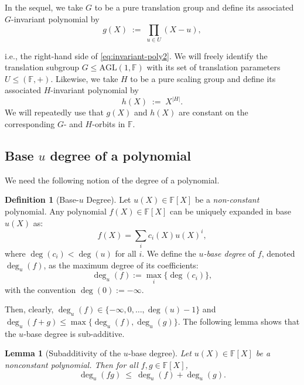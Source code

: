 \documentclass[11pt]{article}
\theoremstyle{plain}
\newtheorem{lemma}[theorem]{Lemma}
\theoremstyle{definition}
\newtheorem{definition}[theorem]{Definition}
\newcommand{\F}{\mathbb{F}}
\begin{document}
\smallskip
\noindent
In the sequel, we take $G$ to be a pure translation group and define its associated $G$-invariant polynomial by
\begin{equation}
\label{eq:additive-subgroup-poly}    
g(X) \;:=\; \prod_{u\in U}(X-u),
\end{equation}

i.e., the right-hand side of \eqref{eq:invariant-poly2}. We will freely identify the translation subgroup $G\le\mathrm{AGL}(1,\mathbb{F})$ with its set of translation parameters $U\le(\mathbb{F},+)$.
Likewise, we take $H$ to be a pure scaling group and define its associated $H$-invariant polynomial by
\begin{equation}
    \label{eq:mult-subgroup-poly}
h(X) \;:=\; X^{|H|}.
\end{equation}
We will repeatedly use that $g(X)$ and $h(X)$ are constant on the corresponding $G$- and $H$-orbits in $\mathbb{F}$.



\subsection{\texorpdfstring{Base $u$ degree of a polynomial}{Base u degree of a polynomial}}

We need the following notion of the degree of a polynomial.

\begin{definition}[Base-$u$ Degree]
    Let $u(X) \in \mathbb{F}[X]$ be a \emph{non-constant} polynomial. Any polynomial $f(X) \in \mathbb{F}[X]$ can be uniquely expanded in base $u(X)$ as:
    \[
        f(X) = \sum_{i} c_i(X) u(X)^i,
    \]
    where $\deg(c_i) < \deg(u)$ for all $i$. We define the \emph{$u$-base degree} of $f$, denoted $\deg_u(f)$, as the maximum degree of its coefficients:
    \[
        \deg_u(f) := \max_i \{ \deg(c_i) \},
    \]
    with the convention $\deg(0):=-\infty$.
\end{definition}
Then, clearly, $\deg_u(f)\in \{-\infty,0,\ldots,\deg(u)-1\}$ and $\deg_u(f+g)\leq \max\{\deg_u(f),\deg_u(g)\}$. 
The following lemma shows that the $u$-base degree is sub-additive. 
\begin{lemma}[Subadditivity of the $u$-base degree]
\label{lem:base-u-subadditive}
Let  $u(X)\in\F[X]$ be a nonconstant polynomial.
Then for all $f,g\in\F[X]$,
\[
    \deg_u(fg)\ \le\ \deg_u(f)+\deg_u(g).
\]
\end{lemma}
\end{document}
